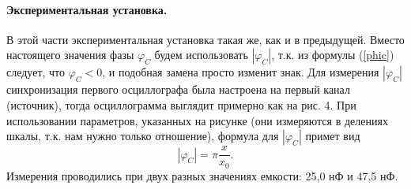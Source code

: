 \documentclass[12pt,a4paper]{article}
\begin{document}
\paragraph{Экспериментальная установка.} В этой части экспериментальная установка такая же, как и в предыдущей. Вместо настоящего значения фазы $\varphi_C$ будем использовать $|\varphi_C|$, т.к. из формулы (\ref{phic}) следует, что $\varphi_C < 0$, и подобная замена просто изменит знак. Для измерения $|\varphi_C|$ синхронизация первого осциллографа была настроена на первый канал (источник), тогда осциллограмма выглядит примерно как на рис. 4. При использовании параметров, указанных на рисунке (они измеряются в делениях шкалы, т.к. нам нужно только отношение), формула для $|\varphi_C|$ примет вид
\begin{equation}
|\varphi_C| = \pi\frac{x}{x_0}\label{pcee}.
\end{equation}
Измерения проводились при двух разных значениях емкости: 25,0 нФ и 47,5 нФ.
\end{document}
